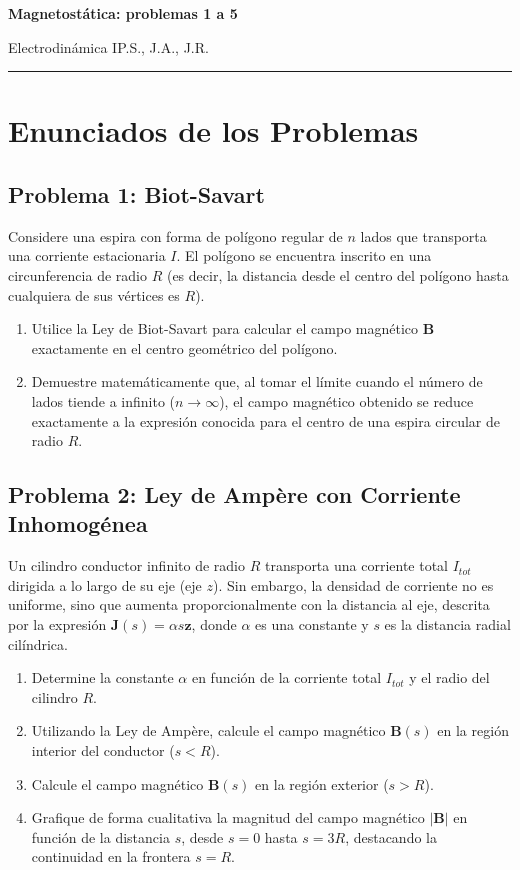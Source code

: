 \documentclass[11pt]{article}
\newcommand{\encabezado}[3]{%
  {\Large\bfseries #1\par}\vspace{2pt}
  {\normalsize #2\hfill #3\par}
  \vspace{6pt}\hrule\vspace{8pt}}
\begin{document}
\encabezado{Magnetostática: problemas 1 a 5}
{Electrodinámica I}{P.S., J.A., J.R.}

\section*{Enunciados de los Problemas}

\subsection*{Problema 1: Biot-Savart}
Considere una espira con forma de polígono regular de $n$ lados que transporta una corriente estacionaria $I$. El polígono se encuentra inscrito en una circunferencia de radio $R$ (es decir, la distancia desde el centro del polígono hasta cualquiera de sus vértices es $R$).
\begin{enumerate}
    \item[a)] Utilice la Ley de Biot-Savart para calcular el campo magnético $\mathbf{B}$ exactamente en el centro geométrico del polígono. 
    \item[b)] Demuestre matemáticamente que, al tomar el límite cuando el número de lados tiende a infinito ($n \to \infty$), el campo magnético obtenido se reduce exactamente a la expresión conocida para el centro de una espira circular de radio $R$.
\end{enumerate}

\subsection*{Problema 2: Ley de Ampère con Corriente Inhomogénea}
Un cilindro conductor infinito de radio $R$ transporta una corriente total $I_{tot}$ dirigida a lo largo de su eje (eje $z$). Sin embargo, la densidad de corriente no es uniforme, sino que aumenta proporcionalmente con la distancia al eje, descrita por la expresión $\mathbf{J}(s) = \alpha s \hat{\mathbf{z}}$, donde $\alpha$ es una constante y $s$ es la distancia radial cilíndrica.
\begin{enumerate}
    \item[a)] Determine la constante $\alpha$ en función de la corriente total $I_{tot}$ y el radio del cilindro $R$.
    \item[b)] Utilizando la Ley de Ampère, calcule el campo magnético $\mathbf{B}(s)$ en la región interior del conductor ($s < R$).
    \item[c)] Calcule el campo magnético $\mathbf{B}(s)$ en la región exterior ($s > R$).
    \item[d)] Grafique de forma cualitativa la magnitud del campo magnético $|\mathbf{B}|$ en función de la distancia $s$, desde $s=0$ hasta $s=3R$, destacando la continuidad en la frontera $s=R$.
\end{enumerate}
\end{document}
